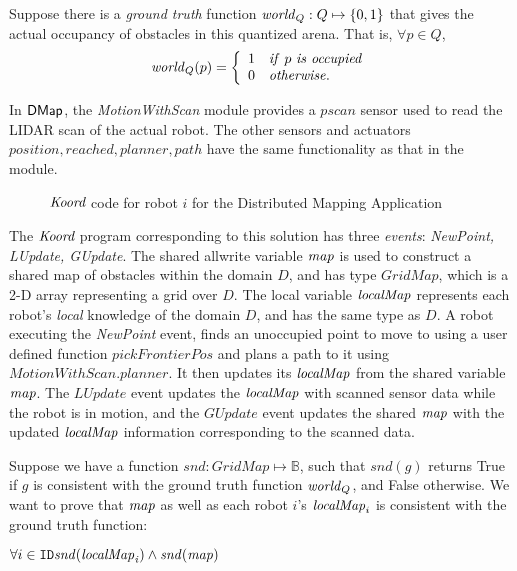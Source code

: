 Suppose there is a \emph{ground truth} function $\mathit{world}_Q : Q \mapsto \left\{0,1\right\}$ that gives the actual occupancy of obstacles in this quantized arena. That is, $\forall p \in Q$,
\begin{align}
\mathit{world}_Q(p) =
        \left\{
        \begin{array}{ll}
            1 & \mathit{if}\ p \ \mathit{is \ occupied}\\
            0 & \mathit{otherwise}.
        \end{array}
        \right.
\end{align}

\newcommand{\MotionWithScan}{\emph{MotionWithScan}\xspace}

In ${\sf DMap}$, the \MotionWithScan module provides a $\mathit{pscan}$ sensor used to read the LIDAR scan of the actual robot. The other sensors and actuators $\mathit{position,reached,planner,path}$ have the same functionality as that in the \Motion module.

\begin{figure}[t]
    {
    
    }
    {
    
    }
    \caption{ $\emph{Koord}$ code for robot $i$ for the Distributed Mapping Application}
    \label{fig:mapapp }
\end{figure}

 The $\emph{Koord}$ program corresponding to this solution has three \emph{events}: \emph{NewPoint, LUpdate, GUpdate}. The shared allwrite variable $\mathit{map}$ is used to construct a shared map of obstacles within the domain $D$, and has type $\mathit{GridMap}$, which is a 2-D array representing a grid over $D$. The local variable $\mathit{localMap}$ represents each robot's \emph{local} knowledge of the domain $D$, and has the same type as $D$. A robot executing the \emph{NewPoint} event, finds an unoccupied point to move to using a user defined function $\mathit{pickFrontierPos}$ and plans a path to it using $\mathit{MotionWithScan.planner}$. It then updates its $\mathit{localMap}$ from the shared variable $\mathit{map}$. The $\mathit{LUpdate}$ event updates the $\mathit{localMap}$ with scanned sensor data while the robot is in motion, and the $\mathit{GUpdate}$ event updates the shared $\mathit{map}$ with the updated $\mathit{localMap}$ information corresponding to the scanned data.


Suppose we have a function $\mathit{snd}: GridMap \mapsto \mathbb{B}$, such that $\mathit{snd}(g)$ returns True if $g$ is consistent with the ground truth function $\mathit{world}_Q$, and False otherwise. We want to prove that $\mathit{map}$ as well as each robot $i$'s $\mathit{localMap}_i$ is consistent with the ground truth function:
\begin{invariant}
    \label{inv:mapping}
    $\forall i \in \texttt{ID} \mathit{snd(\mathit{localMap}_i)} \wedge \mathit{snd(\mathit{map})}$
\end{invariant}

